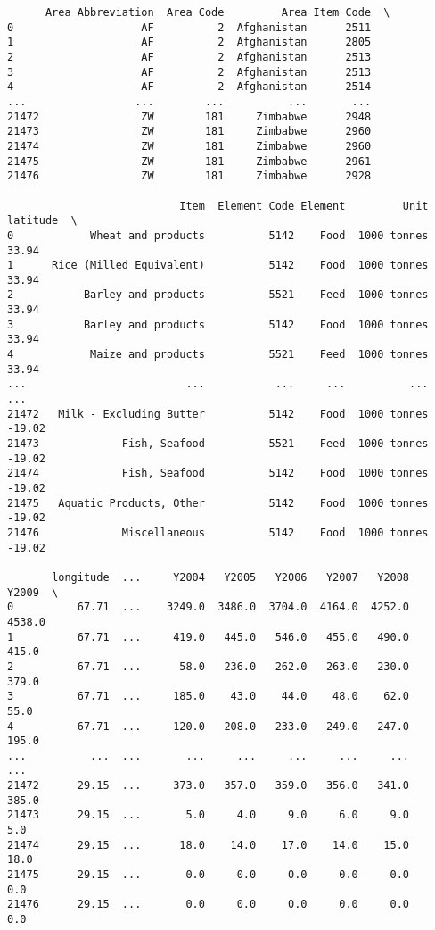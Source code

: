 \documentclass[11pt]{article}
\begin{document}
    
    \begin{verbatim}
      Area Abbreviation  Area Code         Area Item Code  \
0                    AF          2  Afghanistan      2511   
1                    AF          2  Afghanistan      2805   
2                    AF          2  Afghanistan      2513   
3                    AF          2  Afghanistan      2513   
4                    AF          2  Afghanistan      2514   
...                 ...        ...          ...       ...   
21472                ZW        181     Zimbabwe      2948   
21473                ZW        181     Zimbabwe      2960   
21474                ZW        181     Zimbabwe      2960   
21475                ZW        181     Zimbabwe      2961   
21476                ZW        181     Zimbabwe      2928   

                           Item  Element Code Element         Unit  latitude  \
0            Wheat and products          5142    Food  1000 tonnes     33.94   
1      Rice (Milled Equivalent)          5142    Food  1000 tonnes     33.94   
2           Barley and products          5521    Feed  1000 tonnes     33.94   
3           Barley and products          5142    Food  1000 tonnes     33.94   
4            Maize and products          5521    Feed  1000 tonnes     33.94   
...                         ...           ...     ...          ...       ...   
21472   Milk - Excluding Butter          5142    Food  1000 tonnes    -19.02   
21473             Fish, Seafood          5521    Feed  1000 tonnes    -19.02   
21474             Fish, Seafood          5142    Food  1000 tonnes    -19.02   
21475   Aquatic Products, Other          5142    Food  1000 tonnes    -19.02   
21476             Miscellaneous          5142    Food  1000 tonnes    -19.02   

       longitude  ...     Y2004   Y2005   Y2006   Y2007   Y2008   Y2009  \
0          67.71  ...    3249.0  3486.0  3704.0  4164.0  4252.0  4538.0   
1          67.71  ...     419.0   445.0   546.0   455.0   490.0   415.0   
2          67.71  ...      58.0   236.0   262.0   263.0   230.0   379.0   
3          67.71  ...     185.0    43.0    44.0    48.0    62.0    55.0   
4          67.71  ...     120.0   208.0   233.0   249.0   247.0   195.0   
...          ...  ...       ...     ...     ...     ...     ...     ...   
21472      29.15  ...     373.0   357.0   359.0   356.0   341.0   385.0   
21473      29.15  ...       5.0     4.0     9.0     6.0     9.0     5.0   
21474      29.15  ...      18.0    14.0    17.0    14.0    15.0    18.0   
21475      29.15  ...       0.0     0.0     0.0     0.0     0.0     0.0   
21476      29.15  ...       0.0     0.0     0.0     0.0     0.0     0.0   


\end{verbatim}
\end{document}
